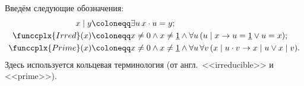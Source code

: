 

\begin{definition*}
    Введём следующие обозначения:
    \begin{align*}
      x \mid y &\coloneqq \exists u\, x \cdot u = y;\\
      \funccplx{Irred}(x) &\coloneqq x \ne 0 \wedge x \ne \underline{1} \wedge
                            \forall u\, (u \mid x \rightarrow u = \underline{1} \vee u = x);\\
      \funccplx{Prime}(x) &\coloneqq x \ne 0 \wedge x \ne \underline{1} \wedge
                            \forall u\, \forall v\, (x \mid u \cdot v \rightarrow x \mid u \vee x \mid
                            v).
    \end{align*}
    Здесь используется кольцевая терминология (от англ.\ <<irreducible>> и <<prime>>).
\end{definition*}










